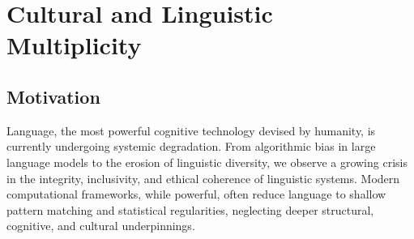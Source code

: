 \documentclass{article}
\theoremstyle{plain}
\theoremstyle{claimstyle}
\begin{document}
\begin{abstract}
This paper introduces \textit{Linguistic Intelligence Theory}, a comprehensive framework unifying language, cognition, ethics, and computation through a quantum-symbolic paradigm. Moving beyond the limitations of Chomskyan formalism and transformer-based models, we propose a recursive, hypergraph-based tensor formalism that encodes language as a dynamic, ethically-constrained field of semantic interactions.

Central to this theory are three constructs: the Universal Multiplicity Constant $\Lambda_m$, the Recursive Operator $\Xi(t)$, and Prime-Indexed Recursive Tensor Mathematics (PIRTM). These are integrated within a \textit{Hyperlinguistic Tensor} $\mathcal{H}_{\alpha\beta\gamma}^{ijk}$, capable of representing phonetic, syntactic, and semantic data across temporal and cognitive dimensions.

We formulate quantum linguistic dynamics via causal triangulation, decoherence metrics, and entanglement-based syntax, while embedding ethical reasoning using Civic Sovereignty Logic (CSL) tensors. Evolutionary dynamics of language are modeled through hypergraph replicator equations and game-theoretic equilibria, with applications spanning linguistic steganography, decentralized language preservation, and neurosymbolic AI.

The framework supports implementation via quantum–symbolic simulation engines, curriculum design for recursive literacy, and tools for indigenous language conservation. By positioning language as a conserved, multi-scale field of agency and meaning, this theory lays the foundation for a new class of ethically-aligned, cognitively resonant linguistic intelligence systems.
\end{abstract}


\section{Cultural and Linguistic Multiplicity}

\subsection{Motivation}

Language, the most powerful cognitive technology devised by humanity, is currently undergoing systemic degradation. From algorithmic bias in large language models to the erosion of linguistic diversity, we observe a growing crisis in the integrity, inclusivity, and ethical coherence of linguistic systems. Modern computational frameworks, while powerful, often reduce language to shallow pattern matching and statistical regularities, neglecting deeper structural, cognitive, and cultural underpinnings.
\end{document}

